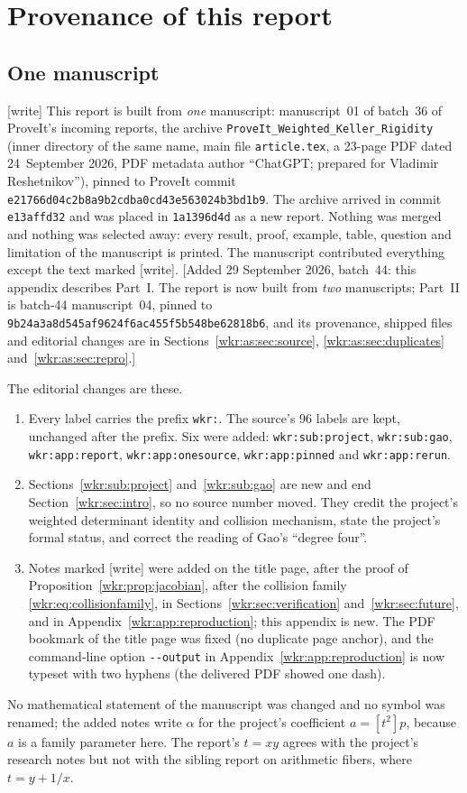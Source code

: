 \documentclass[11pt,a4paper]{article}
\numberwithin{equation}{section}
\theoremstyle{definition}
\theoremstyle{remark}
\newcommand{\wtag}{\textup{[write]}}%
\begin{document}
\section{Provenance of this report}\label{wkr:app:report}

\subsection{One manuscript}\label{wkr:app:onesource}
\wtag{} This report is built from \emph{one} manuscript: manuscript~01 of
batch~36 of ProveIt's incoming reports, the archive
\texttt{ProveIt\_Weighted\_Keller\_Rigidity} (inner directory of the same
name, main file \texttt{article.tex}, a 23-page PDF dated 24~September
2026, PDF metadata author ``ChatGPT; prepared for Vladimir Reshetnikov''),
pinned to ProveIt commit
\nolinkurl{e21766d04c2b8a9b2cdba0cd43e563024b3bd1b9}. The archive arrived in
commit \texttt{e13affd32} and was placed in \texttt{1a1396d4d} as a new
report. Nothing was merged and nothing was selected away: every result,
proof, example, table, question and limitation of the manuscript is
printed. The manuscript contributed everything except the text marked
\wtag.
[Added 29 September 2026, batch~44: this appendix describes Part~I. The
report is now built from \emph{two} manuscripts; Part~II is batch-44
manuscript~04, pinned to \nolinkurl{9b24a3a8d545af9624f6ac455f5b548be62818b6},
and its provenance, shipped files and editorial changes are in
Sections~\ref{wkr:as:sec:source}, \ref{wkr:as:sec:duplicates}
and~\ref{wkr:as:sec:repro}.]

The editorial changes are these.
\begin{enumerate}[label=(\arabic*)]
\item Every label carries the prefix \texttt{wkr:}. The source's 96 labels
are kept, unchanged after the prefix. Six were added:
\texttt{wkr:sub:project}, \texttt{wkr:sub:gao}, \texttt{wkr:app:report},
\texttt{wkr:app:onesource}, \texttt{wkr:app:pinned} and
\texttt{wkr:app:rerun}.
\item Sections~\ref{wkr:sub:project} and~\ref{wkr:sub:gao} are new and
end Section~\ref{wkr:sec:intro}, so no source number moved. They credit
the project's weighted determinant identity and collision mechanism,
state the project's formal status, and correct the reading of Gao's
``degree four''.
\item Notes marked \wtag{} were added on the title page, after the proof
of Proposition~\ref{wkr:prop:jacobian}, after the collision family
\eqref{wkr:eq:collisionfamily}, in Sections~\ref{wkr:sec:verification}
and~\ref{wkr:sec:future}, and in Appendix~\ref{wkr:app:reproduction}; this
appendix is new. The PDF bookmark of the title page was fixed (no
duplicate page anchor), and the command-line option
\texttt{-{}-output} in Appendix~\ref{wkr:app:reproduction} is now typeset
with two hyphens (the delivered PDF showed one dash).
\end{enumerate}
No mathematical statement of the manuscript was changed and no symbol was
renamed; the added notes write $\alpha$ for the project's coefficient
$a=[t^2]p$, because $a$ is a family parameter here. The report's $t=xy$
agrees with the project's research notes but not with the sibling report
on arithmetic fibers, where $t=y+1/x$.
\end{document}
